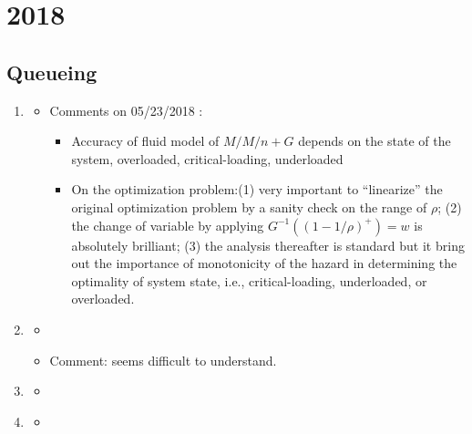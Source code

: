 \section{2018}
\subsection{Queueing}
\begin{enumerate}

\item \citet{bassamboo2010accuracy}
\begin{itemize}
\item Comments on 05/23/2018 :
\begin{itemize}
\item Accuracy of fluid model of $M/M/n+G$ depends on the state of the system, overloaded, critical-loading, underloaded
\item On the optimization problem:(1) very important to ``linearize'' the original optimization problem by a sanity check on the range of $\rho$; (2) the change of variable by applying $G^{-1}((1-1/\rho)^{+})=w$ is absolutely brilliant; (3) the analysis thereafter is standard but it bring out the importance of monotonicity of the hazard in determining the optimality of system state, i.e., critical-loading, underloaded, or overloaded.
\end{itemize}

\end{itemize}

\item \citet{zeltyn2005call}
\begin{itemize}
\item 
\item Comment: seems difficult to understand.
\end{itemize}


\item \citet{ward2005diffusion}
\begin{itemize}
    \item 
\end{itemize}

\item \citet{Halfin1981Heavy-TrafficServers.}
\begin{itemize}
    \item 
\end{itemize}
\end{enumerate}

